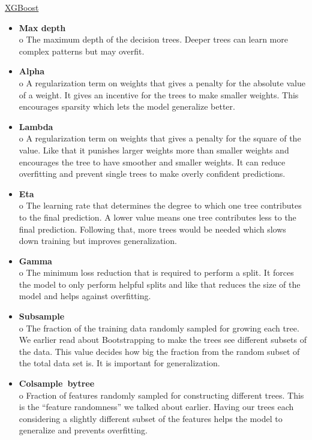\documentclass[a4paper,12pt]{report}
\begin{document}
\begin{minipage}{\textwidth}
\underline{XGBoost}
\begin{itemize}
  \item \textbf{Max depth} \\
  o The maximum depth of the decision trees. Deeper trees can learn more complex patterns but may overfit.

  \item \textbf{Alpha} \\
  o A regularization term on weights that gives a penalty for the absolute value of a weight. It gives an incentive for the trees to make smaller weights. This encourages sparsity which lets the model generalize better.

\end{itemize}
\end{minipage}
\begin{itemize}

  \item \textbf{Lambda} \\
  o A regularization term on weights that gives a penalty for the square of the value. Like that it punishes larger weights more than smaller weights and encourages the tree to have smoother and smaller weights. It can reduce overfitting and prevent single trees to make overly confident predictions.

  \item \textbf{Eta} \\
  o The learning rate that determines the degree to which one tree contributes to the final prediction. A lower value means one tree contributes less to the final prediction. Following that, more trees would be needed which slows down training but improves generalization.

  \item \textbf{Gamma} \\
  o The minimum loss reduction that is required to perform a split. It forces the model to only perform helpful splits and like that reduces the size of the model and helps against overfitting.

  \item \textbf{Subsample} \\
  o The fraction of the training data randomly sampled for growing each tree. We earlier read about Bootstrapping to make the trees see different subsets of the data. This value decides how big the fraction from the random subset of the total data set is. It is important for generalization.

  \item \textbf{Colsample\ bytree} \\
  o Fraction of features randomly sampled for constructing different trees. This is the “feature randomness” we talked about earlier. Having our trees each considering a slightly different subset of the features helps the model to generalize and prevents overfitting.
\end{itemize}
\end{document}
